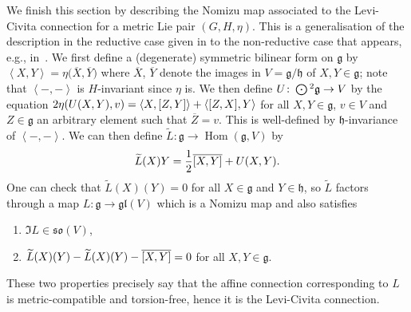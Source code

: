 \documentclass[11pt]{article}
\numberwithin{equation}{section}
\numberwithin{equation}{section}
\newcommand{\fg}{\mathfrak{g}}
\newcommand{\fh}{\mathfrak{h}}
\newcommand{\fgl}{\mathfrak{gl}}
\newcommand{\fso}{\mathfrak{so}}
\newcommand{\Odot}{\mathchoice{{\textstyle\bigodot}}{\bigodot}{\bigodot}{\bigodot}}
\newcommand{\1}{\mathbbm{1}}
\newcommand{\pair}[2]{\left\langle #1,#2\right\rangle} %
\DeclareMathOperator{\Hom}{Hom}
\begin{document}
We finish this section by describing the Nomizu map associated to the Levi-Civita connection for a metric Lie pair $(G,H,\eta)$. This is a generalisation of the description in the reductive case given in \cite{Nomizu1969} to the non-reductive case that appears, e.g., in~\cite{Figueroa-OFarrill2017_1}. We first define a (degenerate) symmetric bilinear form on $\fg$ by $\pair{X}{Y}=\eta\bigl(\overline{X},\overline{Y}\bigr)$ where $\overline{X}$, $\overline{Y}$ denote the images in $V=\fg/\fh$ of $X,Y\in\fg$; note that $\pair{-}{-}$ is $H$-invariant since $\eta$ is. We then define $U\colon \Odot^2\fg\to V$ by the equation
$2\eta(U(X,Y),v) = \pair{X}{\comm{Z}{Y}} + \pair{\comm{Z}{X}}{Y}
$
for all $X,Y\in\fg$, $v\in V$ and $Z\in\fg$ an arbitrary element such that $\overline{Z}=v$. This is well-defined by $\fh$-invariance of $\pair{-}{-}$. We can then define $\widetilde{L}\colon \fg\to\Hom(\fg,V)$ by
\[
	\widetilde{L}(X)Y = \frac{1}{2}\overline{\comm{X}{Y}} + U(X,Y).
\]
One can check that $\widetilde{L}(X)(Y)=0$ for all $X\in\fg$ and $Y\in\fh$, so $\widetilde{L}$ factors through a map $L\colon \fg\to\fgl(V)$ which is a Nomizu map and also satisfies
\begin{enumerate}\itemsep=0pt
	\item $\Im L\in\fso(V)$,
	\item $\widetilde{L}(X)(Y) - \widetilde{L}(X)(Y) - \overline{\comm{X}{Y}} = 0$ for all $X,Y\in \fg$.
\end{enumerate}
These two properties precisely say that the affine connection corresponding to $L$ is metric-compatible and torsion-free, hence it is the Levi-Civita connection.
\end{document}
